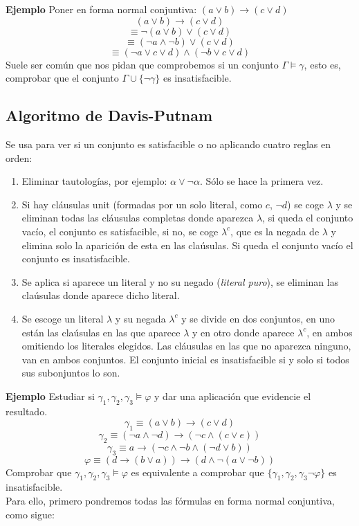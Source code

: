 \documentclass[a4paper]{article}
\theoremstyle{plain} \newtheorem{PrimerPrincipio}{Teorema}
\theoremstyle{plain} \newtheorem{SegundoPrincipio}{Teorema}
\begin{document}
\large{\textbf{Ejemplo}}
Poner en forma normal conjuntiva: $(a\lor b)\rightarrow(c\lor d)$
$$(a\lor b)\rightarrow(c\lor d)$$
$$\equiv\neg(a\lor b)\lor (c\lor d)$$
$$\equiv (\neg a \land \neg b)\lor(c \lor d)$$
$$\equiv (\neg a\lor c\lor d) \land (\neg b\lor c \lor d)$$
Suele ser común que nos pidan que comprobemos si un conjunto $\Gamma\models\gamma$, esto es, comprobar que el conjunto $\Gamma\cup\lbrace\neg\gamma\rbrace$ es insatisfacible.

\subsection{Algoritmo de Davis-Putnam}
Se usa para ver si un conjunto es satisfacible o no aplicando cuatro reglas en orden:
\begin{enumerate}[I]
\item Eliminar tautologías, por ejemplo: $\alpha\lor\neg\alpha$. Sólo se hace la primera vez.
\item Si hay cláusulas unit (formadas por un solo literal, como $c$, $\neg d$) se coge $\lambda$ y se eliminan todas las cláusulas completas donde aparezca $\lambda$, si queda el conjunto vacío, el conjunto es satisfacible, si no, se coge $\lambda^c$, que es la negada de $\lambda$ y elimina solo la aparición de esta en las claúsulas. Si queda el conjunto vacío el conjunto es insatisfacible.
\item Se aplica si aparece un literal y no su negado (\emph{literal puro}), se eliminan las claúsulas donde aparece dicho literal.
\item Se escoge un literal $\lambda$ y su negada $\lambda^c$ y se divide en dos conjuntos, en uno están las claúsulas en las que aparece $\lambda$ y en otro donde aparece $\lambda^c$, en ambos omitiendo los literales elegidos. Las cláusulas en las que no aparezca ninguno, van en ambos conjuntos. El conjunto inicial es insatisfacible si y solo si todos sus subonjuntos lo son.
\end{enumerate}

\large{\textbf{Ejemplo}}
Estudiar si $\gamma_1,\gamma_2,\gamma_3\models\varphi$ y dar una aplicación que evidencie el resultado.
$$\gamma_1\equiv(a\lor b)\rightarrow(c\lor d)$$
$$\gamma_2\equiv(\neg a\land\neg d)\rightarrow(\neg c\land(c\lor e))$$
$$\gamma_3\equiv a \rightarrow(\neg c\land\neg b\land(\neg d\lor b))$$
$$\varphi\equiv(d\rightarrow(b\lor a))\rightarrow(d\land\neg(a\lor\neg b))$$
Comprobar que $\gamma_1,\gamma_2,\gamma_3\models\varphi$ es equivalente a comprobar que $\{\gamma_1,\gamma_2,\gamma_3\neg\varphi\}$ es insatisfacible.\\
Para ello, primero pondremos todas las fórmulas en forma normal conjuntiva, como sigue:
\end{document}
